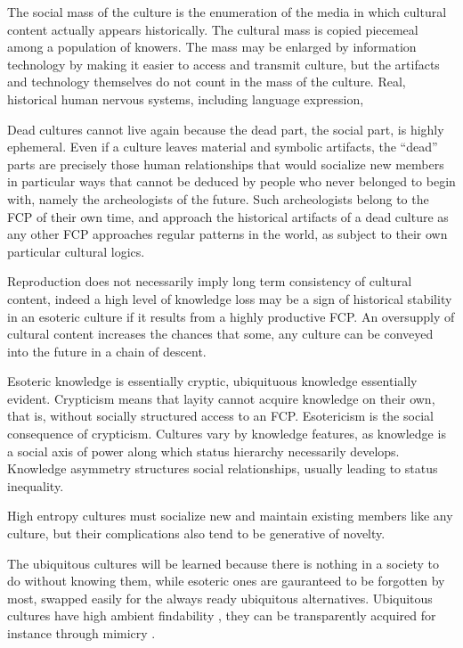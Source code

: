 \documentclass[]{book}
\theoremstyle{definition}
\theoremstyle{definition}
\theoremstyle{definition}
\theoremstyle{remark}
\begin{document}
The social mass of the culture is the enumeration of the media in which
cultural content actually appears historically. The cultural mass is
copied piecemeal among a population of knowers. The mass may be enlarged
by information technology by making it easier to access and transmit
culture, but the artifacts and technology themselves do not count in the
mass of the culture. Real, historical human nervous systems, including
language expression,

Dead cultures cannot live again because the dead part, the social part,
is highly ephemeral. Even if a culture leaves material and symbolic
artifacts, the ``dead'' parts are precisely those human relationships
that would socialize new members in particular ways that cannot be
deduced by people who never belonged to begin with, namely the
archeologists of the future. Such archeologists belong to the FCP of
their own time, and approach the historical artifacts of a dead culture
as any other FCP approaches regular patterns in the world, as subject to
their own particular cultural logics.

Reproduction does not necessarily imply long term consistency of
cultural content, indeed a high level of knowledge loss may be a sign of
historical stability in an esoteric culture if it results from a highly
productive FCP. An oversupply of cultural content increases the chances
that some, any culture can be conveyed into the future in a chain of
descent.

Esoteric knowledge is essentially cryptic, ubiquituous knowledge
essentially evident. Crypticism means that layity cannot acquire
knowledge on their own, that is, without socially structured access to
an FCP. Esotericism is the social consequence of crypticism. Cultures
vary by knowledge features, as knowledge is a social axis of power along
which status hierarchy necessarily develops. Knowledge asymmetry
structures social relationships, usually leading to status inequality.

High entropy cultures must socialize new and maintain existing members
like any culture, but their complications also tend to be generative of
novelty.

The ubiquitous cultures will be learned because there is nothing in a
society to do without knowing them, while esoteric ones are gauranteed
to be forgotten by most, swapped easily for the always ready ubiquitous
alternatives. Ubiquitous cultures have high ambient findability
\citep{Morville2009Ambient}, they can be transparently acquired for
instance through mimicry \citep{DiMaggio1983Iron}.
\end{document}
